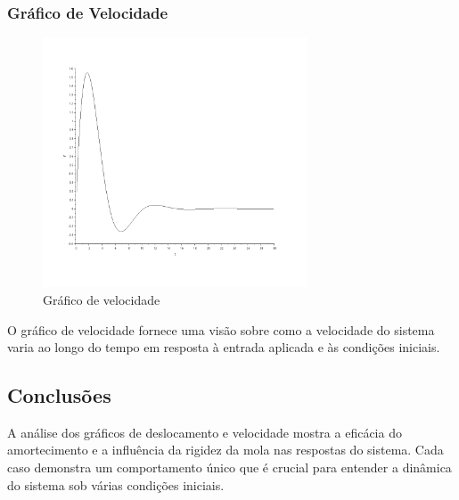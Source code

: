 \subsubsection{Gráfico de Velocidade}
\begin{figure}[H]
    \centering
    \includegraphics[width=0.7\textwidth]{2-atividade/assets/velocidade.png}
    \caption{Gráfico de velocidade}
\end{figure}
O gráfico de velocidade fornece uma visão sobre como a velocidade do sistema varia ao longo do tempo em resposta à entrada aplicada e às condições iniciais.

\subsection{Conclusões}
A análise dos gráficos de deslocamento e velocidade mostra a eficácia do amortecimento e a influência da rigidez da mola nas respostas do sistema. Cada caso demonstra um comportamento único que é crucial para entender a dinâmica do sistema sob várias condições iniciais.
